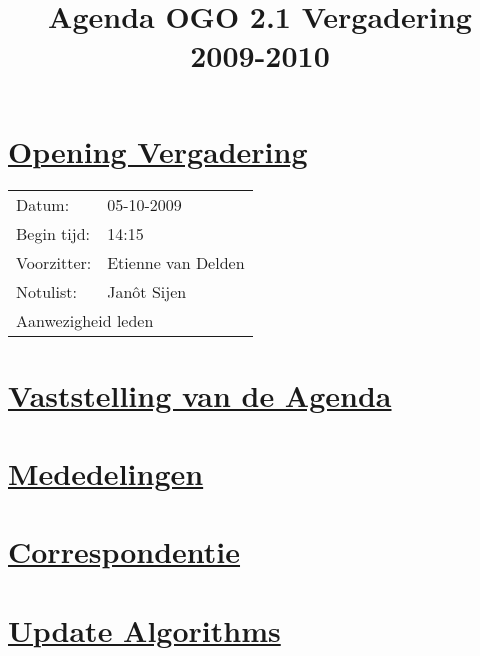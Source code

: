 \documentclass[a4paper]{article}
\title{Agenda OGO 2.1 Vergadering 2009-2010}
\date{}
\begin{document}
\ifpdf
{}
\else
{}
\fi

\maketitle

\section{\underline{Opening Vergadering}} %
\label{sec:opening_vergadering}
\begin{tabular}{ll}
  Datum:      & 05-10-2009\\
  Begin tijd: & 14:15\\
  Voorzitter: & Etienne van Delden\\
  Notulist:   & Jan\^ot Sijen\\
  \multicolumn{2}{l}{Aanwezigheid leden}
\end{tabular}



\section{\underline{Vaststelling van de Agenda}} %
\label{sec:vaststelling_van_de_agenda}


%

\section{\underline{Mededelingen}} %
\label{sec:mededelingen}

\section{\underline{Correspondentie}} %
\label{sec:post_in_uit}


\section{\underline{Update Algorithms}} %
\label{sec:feedback_werkplan}
\end{document}

